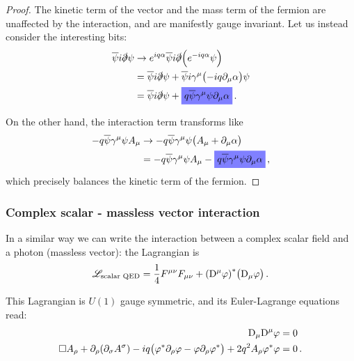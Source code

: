 \documentclass[main.tex]{subfiles}
\begin{document}
\begin{proof}
The kinetic term of the vector and the mass term of the fermion are unaffected by the interaction, and are manifestly gauge invariant. 
Let us instead consider the interesting bits: 
%
\begin{subequations}
\begin{align}
\overline{\psi} i \slashed{\partial} \psi &\to e^{iq \alpha } \overline{\psi} i \slashed{\partial} \qty(e^{-iq \alpha } \psi )  \\
&= \overline{\psi} i \slashed{\partial} \psi 
+ \overline{\psi} i \gamma^{\mu } \qty(-iq \partial_{\mu } \alpha ) \psi  \\
&= \overline{\psi} i \slashed{\partial} \psi
+ \hlc{blue}{q \overline{\psi} \gamma^{\mu } \psi   \partial_{\mu } \alpha }
\,.
\end{align}
\end{subequations}

On the other hand, the interaction term transforms like 
%
\begin{subequations}
\begin{align}
- q \overline{\psi} \gamma^{\mu } \psi A_{\mu } &\to -q \overline{\psi} \gamma^{\mu } \psi \qty(A_{\mu } + \partial_{\mu } \alpha )  \\
&= -q \overline{\psi} \gamma^{\mu } \psi A_{\mu } - 
\hlc{blue}{q \overline{\psi} \gamma^{\mu } \psi \partial_{\mu } \alpha }
\,,
\end{align}
\end{subequations}
%
which precisely balances the kinetic term of the fermion. 
\end{proof}

\subsubsection{Complex scalar - massless vector interaction}

In a similar way we can write the interaction between a complex scalar field and a photon (massless vector): the Lagrangian is 
%
\begin{align}
\mathscr{L} _{\text{scalar QED}}
= \frac{1}{4} F^{\mu \nu } F_{\mu \nu } 
+ \qty(\mathrm{D}^{\mu } \varphi )^{*} \qty(\mathrm{D}_{\mu } \varphi )
\,.
\end{align}

\begin{claim}
This Lagrangian is \(U(1)\) gauge symmetric, and 
its Euler-Lagrange equations read: 
%
\begin{subequations}
\begin{align}
\mathrm{D}_{\mu } \mathrm{D}^{\mu } \varphi &= 0   \\
\square A_{\rho } 
+ \partial_\rho \qty(\partial_{\sigma} A^{\sigma})
-iq \qty(\varphi^{*} \partial_{\rho } \varphi - \varphi \partial_{\rho } \varphi^{*})
+ 2 q^2 A_{\rho } \varphi^{*} \varphi 
&=0
\,.
\end{align}
\end{subequations}
\end{claim}
\end{document}
